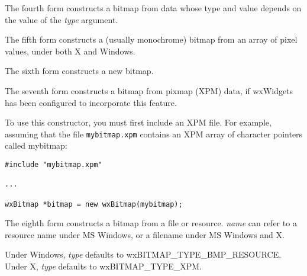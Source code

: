 The fourth form constructs a bitmap from data whose type and value depends on
the value of the {\it type} argument.

The fifth form constructs a (usually monochrome) bitmap from an array of pixel values, under both
X and Windows.

The sixth form constructs a new bitmap.

The seventh form constructs a bitmap from pixmap (XPM) data, if wxWidgets has been configured
to incorporate this feature.

To use this constructor, you must first include an XPM file. For
example, assuming that the file {\tt mybitmap.xpm} contains an XPM array
of character pointers called mybitmap:

\begin{verbatim}
#include "mybitmap.xpm"

...

wxBitmap *bitmap = new wxBitmap(mybitmap);
\end{verbatim}

The eighth form constructs a bitmap from a file or resource. {\it name} can refer
to a resource name under MS Windows, or a filename under MS Windows and X.

Under Windows, {\it type} defaults to wxBITMAP\_TYPE\_BMP\_RESOURCE.
Under X, {\it type} defaults to wxBITMAP\_TYPE\_XPM.





